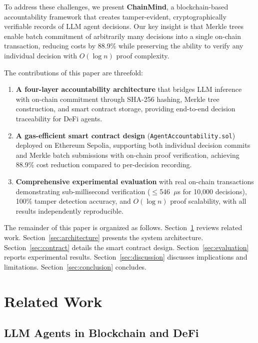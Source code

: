 \documentclass[manuscript,nonacm]{acmart}
\begin{document}
To address these challenges, we present \textbf{ChainMind}, a blockchain-based accountability framework that creates tamper-evident, cryptographically verifiable records of LLM agent decisions. Our key insight is that Merkle trees enable batch commitment of arbitrarily many decisions into a single on-chain transaction, reducing costs by 88.9\% while preserving the ability to verify any individual decision with $O(\log n)$ proof complexity.

The contributions of this paper are threefold:

\begin{enumerate}
    \item \textbf{A four-layer accountability architecture} that bridges LLM inference with on-chain commitment through SHA-256 hashing, Merkle tree construction, and smart contract storage, providing end-to-end decision traceability for DeFi agents.
    
    \item \textbf{A gas-efficient smart contract design} (\texttt{AgentAccountability.sol}) deployed on Ethereum Sepolia, supporting both individual decision commits and Merkle batch submissions with on-chain proof verification, achieving 88.9\% cost reduction compared to per-decision recording.
    
    \item \textbf{Comprehensive experimental evaluation} with real on-chain transactions demonstrating sub-millisecond verification ($\leq$546~$\mu$s for 10,000 decisions), 100\% tamper detection accuracy, and $O(\log n)$ proof scalability, with all results independently reproducible.
\end{enumerate}

The remainder of this paper is organized as follows. Section~\ref{sec:related} reviews related work. Section~\ref{sec:architecture} presents the system architecture. Section~\ref{sec:contract} details the smart contract design. Section~\ref{sec:evaluation} reports experimental results. Section~\ref{sec:discussion} discusses implications and limitations. Section~\ref{sec:conclusion} concludes.


\section{Related Work}
\label{sec:related}

\subsection{LLM Agents in Blockchain and DeFi}
\end{document}
